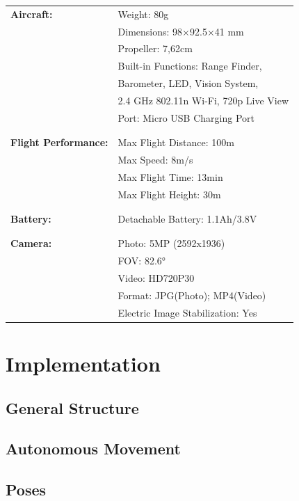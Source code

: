 \documentclass[a4paper,11pt,singlespacing]{article}
\begin{document}
\begin{center}
	\begin{tabular}{ l  l} 
	\hline
	 \textbf{Aircraft:} & Weight: 80g\\
	 & Dimensions: 98×92.5×41 mm  \\
	 & Propeller: 7,62cm\\
	 & Built-in Functions: Range Finder,\\
	 & Barometer, LED, Vision System,\\
	 & 2.4 GHz 802.11n Wi-Fi, 720p Live View\\
	 & Port: Micro USB Charging Port\\\\
	 \hline
	\\
	 \textbf{Flight Performance:} & Max Flight Distance: 100m\\
	 & Max Speed: 8m/s\\
	 & Max Flight Time: 13min\\
	 & Max Flight Height: 30m\\\\
	 \hline
	 \\
	 \textbf{Battery:} & Detachable Battery: 1.1Ah/3.8V\\\\
	 \hline
	 \\
	 \textbf{Camera:} & Photo: 5MP (2592x1936)\\
	 & FOV: 82.6° \\
	 & Video: HD720P30\\
	 & Format: JPG(Photo); MP4(Video)\\
	 & Electric Image Stabilization: Yes\\
	 \hline
	\end{tabular}
\end{center}

\section{Implementation}
\subsection{General Structure}
\subsection{Autonomous Movement}
\subsection{Poses}
\end{document}
